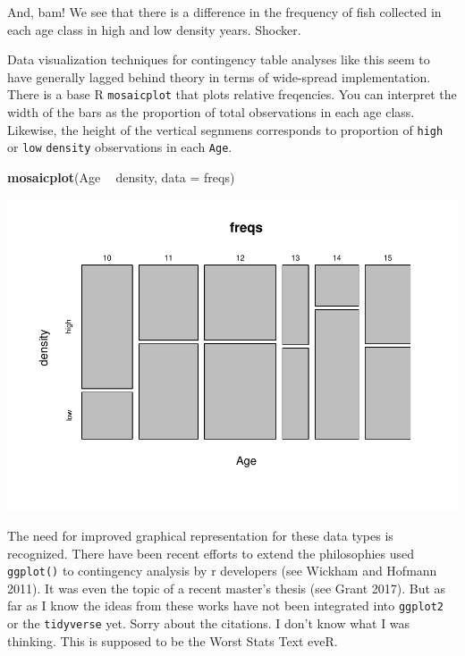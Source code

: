 \documentclass[
]{book}
\newenvironment{Shaded}{\begin{snugshade}}{\end{snugshade}}
\newcommand{\DataTypeTok}[1]{\textcolor[rgb]{0.13,0.29,0.53}{#1}}
\newcommand{\KeywordTok}[1]{\textcolor[rgb]{0.13,0.29,0.53}{\textbf{#1}}}
\newcommand{\NormalTok}[1]{#1}
\newcommand{\OperatorTok}[1]{\textcolor[rgb]{0.81,0.36,0.00}{\textbf{#1}}}
\newcommand{\StringTok}[1]{\textcolor[rgb]{0.31,0.60,0.02}{#1}}
\begin{document}
And, bam! We see that there is a difference in the frequency of fish collected in each age class in high and low density years. Shocker.

Data visualization techniques for contingency table analyses like this seem to have generally lagged behind theory in terms of wide-spread implementation. There is a base R \texttt{mosaicplot} that plots relative freqencies. You can interpret the width of the bars as the proportion of total observations in each age class. Likewise, the height of the vertical segnmens corresponds to proportion of \texttt{high} or \texttt{low} \texttt{density} observations in each \texttt{Age}.

\begin{Shaded}
\begin{Highlighting}[]
\KeywordTok{mosaicplot}\NormalTok{(Age }\OperatorTok{~}\StringTok{ }\NormalTok{density, }\DataTypeTok{data =}\NormalTok{ freqs)}
\end{Highlighting}
\end{Shaded}

\includegraphics{worstr_files/figure-latex/unnamed-chunk-180-1.pdf}

The need for improved graphical representation for these data types is recognized. There have been recent efforts to extend the philosophies used \texttt{ggplot()} to contingency analysis by r developers (see Wickham and Hofmann 2011). It was even the topic of a recent master's thesis (see Grant 2017). But as far as I know the ideas from these works have not been integrated into \texttt{ggplot2} or the \texttt{tidyverse} yet. Sorry about the citations. I don't know what I was thinking. This is supposed to be the Worst Stats Text eveR.
\end{document}
